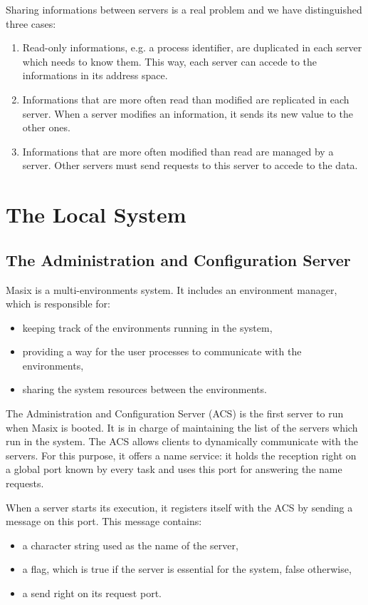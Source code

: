 	Sharing informations between servers is a real problem and we have
distinguished three cases:
\begin {enumerate}
\item Read-only informations, e.g. a process identifier, are duplicated in
each server which needs to know them. This way, each server can accede to the
informations in its address space.
\item Informations that are more often read than modified are replicated in
each server. When a server modifies an information, it sends its new value to
the other ones.
\item Informations that are more often modified than read are managed by a
server. Other servers must send requests to this server to accede to the data.
\end {enumerate}

\section {The Local System}

\subsection {The Administration and Configuration Server}

	Masix is a multi-environments system. It includes an environment
manager, which is responsible for:
\begin {itemize}
\item keeping track of the environments running in the system,
\item providing a way for the user processes to communicate with the
environments,
\item sharing the system resources between the environments.
\end {itemize}

	The Administration and Configuration Server (ACS) is the first server
to run when Masix is booted. It is in charge of maintaining the list of
the servers which run in the system. The ACS allows clients to dynamically
communicate with the servers. For this purpose, it offers a name service: it
holds the reception right on a global port known by every task and uses this
port for answering the name requests.

	When a server starts its execution, it registers itself with
the ACS by sending a message on this port. This message contains:
\begin {itemize}
\item a character string used as the name of the server,
\item a flag, which is true if the server is essential for the system, false
otherwise,
\item a send right on its request port.
\end {itemize}

